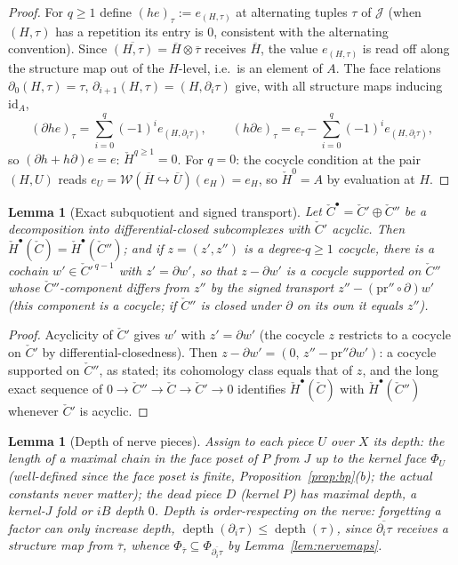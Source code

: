 \documentclass[11pt]{article}
\newtheorem{lemma}[theorem]{Lemma}
\theoremstyle{definition}
\newcommand{\HH}{\check{H}}
\newcommand{\cC}{\check{C}}
\begin{document}
\begin{proof}
For $q\ge1$ define $(he)_\tau:=e_{(H,\tau)}$ at alternating
tuples $\tau$ of $\mathcal J$ \textup{(}when $(H,\tau)$ has a
repetition its entry is $0$, consistent with the alternating
convention\textup{)}. Since
$\overline{(H,\tau)}=\overline H\otimes\overline\tau$ receives
$\overline H$, the value $e_{(H,\tau)}$ is read off along the
structure map out of the $H$-level, i.e.\ is an element of
$A$. The face relations
$\partial_0(H,\tau)=\tau$,
$\partial_{i+1}(H,\tau)=(H,\partial_i\tau)$ give, with all
structure maps inducing $\mathrm{id}_A$,
\[
(\partial h e)_\tau=\sum_{i=0}^{q}(-1)^i e_{(H,\partial_i\tau)},
\qquad
(h\partial e)_\tau=e_\tau-\sum_{i=0}^{q}(-1)^i
e_{(H,\partial_i\tau)},
\]
so $(\partial h+h\partial)e=e$: $\HH^{q\ge1}=0$. For $q=0$: the
cocycle condition at the pair $(H,U)$ reads
$e_U=\mathscr W(\overline H\hookrightarrow\overline U)(e_H)=e_H$,
so $\HH^0=A$ by evaluation at $H$.
\end{proof}

\begin{lemma}[Exact subquotient and signed transport]\label{lem:subquot}
Let $\cC^\bullet=\cC'\oplus\cC''$ be a decomposition into
differential-closed subcomplexes with $\cC'$ acyclic. Then
$\HH^\bullet(\cC)=\HH^\bullet(\cC'')$; and if
$z=(z',z'')$ is a degree-$q\ge1$ cocycle, there is a cochain
$w'\in\cC'^{\,q-1}$ with $z'=\partial w'$, so that
$z-\partial w'$ is a cocycle supported on $\cC''$ whose
$\cC''$-component differs from $z''$ by the signed transport
$z''-(\mathrm{pr}''\circ\partial)w'$ \textup{(}this component is a
cocycle; if $\cC''$ is closed under $\partial$ on its own it equals
$z''$\textup{)}.
\end{lemma}

\begin{proof}
Acyclicity of $\cC'$ gives $w'$ with $z'=\partial w'$ (the cocycle
$z$ restricts to a cocycle on $\cC'$ by differential-closedness).
Then $z-\partial w'=(0,\,z''-\mathrm{pr}''\partial w')$: a cocycle
supported on $\cC''$, as stated; its cohomology class equals that
of $z$, and the long exact sequence of
$0\to\cC''\to\cC\to\cC'\to0$ identifies $\HH^\bullet(\cC)$
with $\HH^\bullet(\cC'')$ whenever $\cC'$ is acyclic.
\end{proof}

\begin{lemma}[Depth of nerve pieces]\label{lem:depth}
Assign to each piece $U$ over $X$ its \emph{depth}: the length of
a maximal chain in the face poset of $P$ from $J$ up to the kernel
face $\Phi_U$ \textup{(}well-defined since the face poset is
finite, Proposition~\ref{prop:bp}\textup{(}b\textup{)}; the actual
constants never matter\textup{)}; the dead piece $D$
\textup{(}kernel $P$\textup{)} has maximal depth, a kernel-$J$
fold or $iB$ depth $0$. Depth is \emph{order-respecting on the
nerve}: forgetting a factor can only increase depth,
$\operatorname{depth}(\partial_i\tau)\le\operatorname{depth}(\tau)$, since
$\overline{\partial_i\tau}$ receives a structure map from
$\overline\tau$, whence
$\Phi_{\overline\tau}\subseteq\Phi_{\overline{\partial_i\tau}}$ by
Lemma~\ref{lem:nervemaps}.
\end{lemma}
\end{document}
